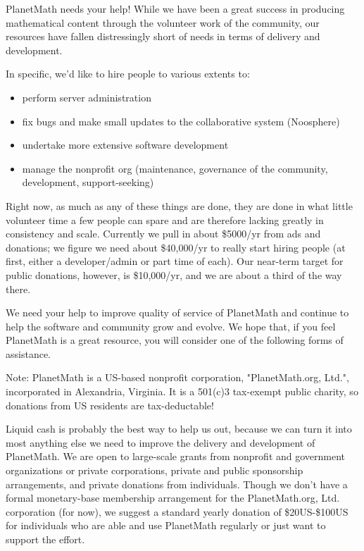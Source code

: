 
PlanetMath needs your help! While we have been a great success in producing
mathematical content through the volunteer work of the community, our resources
have fallen distressingly short of needs in terms of delivery and development.

In specific, we'd like to hire people to various extents to:

\begin{itemize}
\item perform server administration
\item fix bugs and make small updates to the collaborative system (Noosphere)
\item undertake more extensive software development
\item manage the nonprofit org (maintenance, governance of the community,
      development, support-seeking)
\end{itemize}

Right now, as much as any of these things are done, they are done in what
little volunteer time a few people can spare and are therefore lacking greatly
in consistency and scale. Currently we pull in about \$5000/yr from ads and
donations; we figure we need about \$40,000/yr to really start hiring people (at
first, either a developer/admin or part time of each). Our near-term target for
public donations, however, is \$10,000/yr, and we are about a third of the way
there.

We need your help to improve quality of service of PlanetMath and continue to
help the software and community grow and evolve. We hope that, if you feel
PlanetMath is a great resource, you will consider one of the following forms of
assistance.

Note: PlanetMath is a US-based nonprofit corporation, "PlanetMath.org, Ltd.",
incorporated in Alexandria, Virginia. It is a 501(c)3 tax-exempt public
charity, so donations from US residents are tax-deductable!

Liquid cash is probably the best way to help us out, because we can turn it
into most anything else we need to improve the delivery and development of
PlanetMath. We are open to large-scale grants from nonprofit and government
organizations or private corporations, private and public sponsorship
arrangements, and private donations from individuals. Though we don't have a
formal monetary-base membership arrangement for the PlanetMath.org, Ltd.
corporation (for now), we suggest a standard yearly donation of \$20US-\$100US
for individuals who are able and use PlanetMath regularly or just want to
support the effort.

